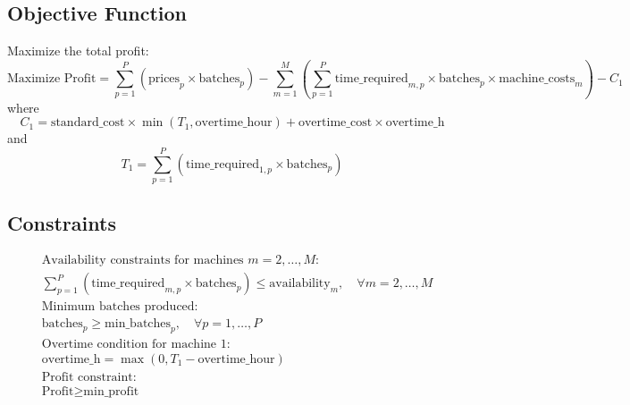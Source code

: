 \documentclass{article}
\begin{document}
\subsection*{Objective Function}
Maximize the total profit:
\[
\text{Maximize } \text{Profit} = \sum_{p=1}^{P} (\text{prices}_{p} \times \text{batches}_{p}) - \sum_{m=1}^{M} \left(\sum_{p=1}^{P} \text{time\_required}_{m,p} \times \text{batches}_{p} \times \text{machine\_costs}_{m}\right) - C_1
\]
where
\[ 
C_1 = \text{standard\_cost} \times \min(T_1, \text{overtime\_hour}) + \text{overtime\_cost} \times \text{overtime\_h} 
\]
and
\[ 
T_1 = \sum_{p=1}^{P} (\text{time\_required}_{1,p} \times \text{batches}_{p})
\]

\subsection*{Constraints}
\begin{align*}
& \text{Availability constraints for machines } m = 2, \ldots, M:\\
& \sum_{p=1}^{P} (\text{time\_required}_{m,p} \times \text{batches}_{p}) \leq \text{availability}_{m}, \quad \forall m = 2, \ldots, M \\
& \text{Minimum batches produced:}\\
& \text{batches}_{p} \geq \text{min\_batches}_{p}, \quad \forall p = 1, \ldots, P \\
& \text{Overtime condition for machine 1:}\\
& \text{overtime\_h} = \max(0, T_1 - \text{overtime\_hour}) \\
& \text{Profit constraint:}\\
& \text{Profit} \geq \text{min\_profit}
\end{align*}
\end{document}
